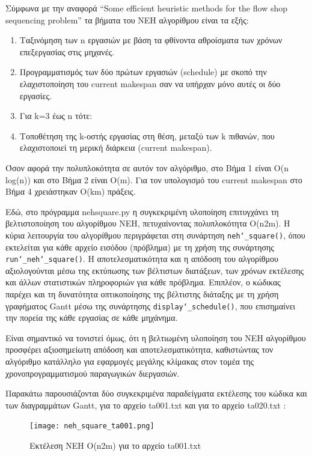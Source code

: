 \documentclass[paper=a4, fontsize=11pt]{scrartcl}
\numberwithin{equation}{section}		%
\numberwithin{figure}{section}			%
\numberwithin{table}{section}				%
\begin{document}
    Σύμφωνα με την αναφορά “Some efficient heuristic methods for the flow shop sequencing problem” τα βήματα του NEH αλγορίθμου είναι τα εξής:

\begin{enumerate}
   \item Ταξινόμηση των n εργασιών με βάση τα φθίνοντα αθροίσματα των χρόνων επεξεργασίας στις μηχανές.
   \item Προγραμματισμός των δύο πρώτων εργασιών (schedule) με σκοπό την ελαχιστοποίηση του current makespan σαν να υπήρχαν μόνο αυτές οι δύο εργασίες.
   \item Για k=3 έως n τότε:
   \item Τοποθέτηση της k-οστής εργασίας στη θέση, μεταξύ των k πιθανών, που ελαχιστοποιεί τη μερική διάρκεια (current makespan).
\end{enumerate}

    Όσον αφορά την πολυπλοκότητα σε αυτόν τον αλγόριθμο, στο Βήμα 1 είναι O(n log(n)) και στο Βήμα 2 είναι O(m). Για τον υπολογισμό του current makespan στο Βήμα 4 χρειάστηκαν O(km) πράξεις.

    Εδώ, στο πρόγραμμα nehsquare.py η συγκεκριμένη υλοποίηση επιτυγχάνει τη βελτιστοποίηση του αλγορίθμου NEH, πετυχαίνοντας πολυπλοκότητα O(n\wedge2m). Η κύρια λειτουργία του αλγορίθμου περιγράφεται στη συνάρτηση \texttt{neh\char`_square()}, όπου εκτελείται για κάθε αρχείο εισόδου (πρόβλημα) με τη χρήση της συνάρτησης \texttt{run\char`_neh\char`_square()}. Η αποτελεσματικότητα και η απόδοση του αλγορίθμου αξιολογούνται μέσω της εκτύπωσης των βέλτιστων διατάξεων, των χρόνων εκτέλεσης και άλλων στατιστικών πληροφοριών για κάθε πρόβλημα. Επιπλέον, ο κώδικας παρέχει και τη δυνατότητα οπτικοποίησης της βέλτιστης διάταξης με τη χρήση γραφήματος Gantt μέσω της συνάρτησης \texttt{display\char`_schedule()}, που επισημαίνει την πορεία της κάθε εργασίας σε κάθε μηχάνημα.

    Είναι σημαντικό να τονιστεί όμως, ότι η βελτιωμένη υλοποίηση του NEH αλγορίθμου προσφέρει αξιοσημείωτη απόδοση και αποτελεσματικότητα, καθιστώντας τον αλγόριθμο κατάλληλο για εφαρμογές μεγάλης κλίμακας στον τομέα της χρονοπρογραμματισμού παραγωγικών διεργασιών.
    
    Παρακάτω παρουσιάζονται δύο συγκεκριμένα παραδείγματα εκτέλεσης του κώδικα και των διαγραμμάτων Gantt, για το αρχείο ta001.txt και για το αρχείο ta020.txt :

\begin{figure}[H]
   \centering
   \texttt{[image: neh\_square\_ta001.png]}
   \caption{Εκτέλεση NEH O(n2m)  για το αρχείο ta001.txt}
   \label{fig:square_ta001}
\end{figure} 
\end{document}
